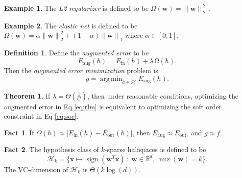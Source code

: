 \documentclass[10pt]{exam}
\theoremstyle{definition}
\newtheorem{example}{Example}
\newtheorem{defn}{Definition}
\newtheorem{fact}{Fact}
\newtheorem{theorem}{Theorem}
\newcommand{\R}{\mathbb R}
\DeclareMathOperator{\nnz}{nnz}
\DeclareMathOperator{\sign}{sign}
\DeclareMathOperator*{\argmin}{arg\,min}
\newcommand{\Ein}{E_{\text{in}}}
\newcommand{\Eout}{E_{\text{out}}}
\newcommand{\Eaug}{E_{\text{aug}}}
\newcommand{\trans}[1]{{#1}^{T}}
\newcommand{\w}{\mathbf w}
\newcommand{\x}{\mathbf x}
\newcommand{\lone}[1]{{\lVert {#1} \rVert}_1}
\newcommand{\ltwo}[1]{{\lVert {#1} \rVert}_2}
\begin{document}
\begin{example}
    The \emph{L2 regularizer} is defined to be
    $
        \Omega(\w) = \ltwo{\w}^2
        $
        .
\end{example}

\begin{example}
    The \emph{elastic net} is defined to be
    $
        \Omega(\w) = \alpha \ltwo{\w}^2 + (1-\alpha) \lone{\w}
        $
    where $\alpha \in [0,1]$.
\end{example}


\newpage
\begin{defn}
Define the \emph{augmented error} to be
\begin{equation}
    \Eaug(h) = \Ein(h) + \lambda\Omega(h)
    .
\end{equation}
    Then the \emph{augmented error minimization} problem is
\begin{equation}
    \label{eq:rlm}
    g = \argmin_{h\in\mathcal H} \Eaug(h)
    .
\end{equation}
\end{defn}

\begin{theorem}
    If $\lambda = \Theta(\tfrac 1C)$, then under reasonable conditions, optimizing the augmented error in Eq \eqref{eq:rlm} is equivalent to optimizing the soft order constraint in Eq \eqref{eq:soc}.
\end{theorem}

\begin{fact}
    If $\Omega(h) \approx |\Ein(h) - \Eout(h)|$,
    then $\Eaug \approx \Eout$,
    and $g\approx f$.
\end{fact}

\newpage
\vspace{0.2in}
\begin{fact}
    The hypothesis class of $k$-sparse halfspaces is defined to be
    \begin{equation}
        \mathcal{H}_k = \bigg\{ \x \mapsto \sign(\trans\w\x) ~:~ \w\in\R^d,~\nnz(\w)=k \bigg\}
        .
    \end{equation}
    The VC-dimension of $\mathcal{H}_k$ is $\Theta(k\log (d))$.
\end{fact}
\end{document}
